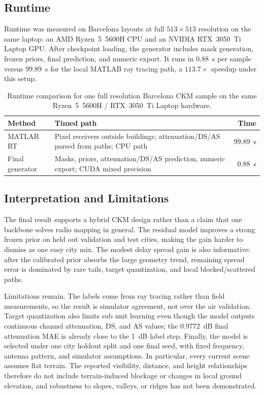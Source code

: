 \documentclass[journal]{IEEEtran}
\begin{document}
\subsection{Runtime}

Runtime was measured on Barcelona layouts at full \(513\times513\) resolution
on the same laptop: an AMD Ryzen~5~5600H CPU and an NVIDIA RTX~3050~Ti Laptop
GPU. After checkpoint loading, the generator includes mask generation, frozen
priors, final prediction, and numeric export. It runs in \SI{0.88}{s} per sample
versus \SI{99.89}{s} for the local MATLAB ray tracing path, a \(113.7\times\)
speedup under this setup.

\begin{table}[t]
\centering
\caption{Runtime comparison for one full resolution Barcelona CKM sample on
the same Ryzen~5~5600H / RTX~3050~Ti Laptop hardware.}
\label{tab:runtime}
\scriptsize
\begin{tabularx}{\linewidth}{lXr}
\toprule
Method & Timed path & Time \\
\midrule
MATLAB RT & Pixel receivers outside buildings; attenuation/DS/AS parsed from paths; CPU path &
\SI{99.89}{s} \\
Final generator & Masks, priors, attenuation/DS/AS prediction, numeric export; CUDA mixed precision &
\SI{0.88}{s} \\
\bottomrule
\end{tabularx}
\end{table}

\subsection{Interpretation and Limitations}

The final result supports a hybrid CKM design rather than a claim that one
backbone solves radio mapping in general. The residual model improves a strong
frozen prior on held out validation and test cities, making the gain harder to
dismiss as one easy city mix. The modest delay
spread gain is also informative: after the calibrated prior absorbs the large
geometry trend, remaining spread error is dominated by rare tails, target
quantization, and local blocked/scattered paths.

Limitations remain. The labels come from ray tracing rather than field
measurements, so the result is simulator agreement, not over the air validation.
Target quantization also limits sub unit learning even though the model outputs
continuous channel attenuation, DS, and AS values; the \SI{0.9772}{dB} final
attenuation MAE is already close to the \SI{1}{dB} label step. Finally, the
model is selected under one city holdout split and one final seed, with fixed
frequency, antenna pattern, and simulator assumptions. In particular, every
current scene assumes flat terrain. The reported visibility, distance, and
height relationships therefore do not include terrain-induced blockage or
changes in local ground elevation, and robustness to slopes, valleys, or ridges
has not been demonstrated.
\end{document}

